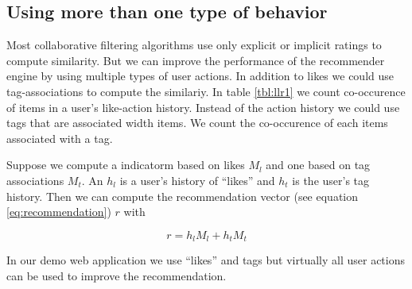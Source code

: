 \subsection{Using more than one type of behavior}
\label{sec:multimodal}

Most collaborative filtering algorithms use only explicit or implicit ratings to compute similarity.
But we can improve the performance of the recommender engine by using multiple types of user actions. In addition to likes we could use tag-associations to compute the similariy. In table \ref{tbl:llr1} we count co-occurence of items in a user's like-action history. Instead of the action history we could use tags that are associated width items. We count the co-occurence of each items associated with a tag.

Suppose we compute a \gls{indicatorm} based on likes $M_l$ and one based on tag associations $M_t$. An $h_l$ is a user's history of ``likes'' and $h_t$ is the user's tag history. Then we can compute the recommendation vector (see equation \ref{eq:recommendation}) $r$ with

\begin{equation}
  \label{eq:multi}
  r = h_l M_l + h_t M_t
\end{equation}

In our demo web application we use ``likes'' and tags but virtually all user actions can be used to improve the recommendation.

